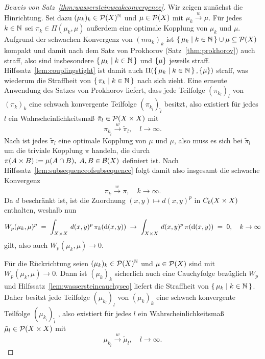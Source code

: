 \documentclass[../main/main.tex]{subfiles}
\begin{document}
	\begin{proof}[Beweis von Satz~\ref{thm:wassersteinweakconvergence}]
		Wir zeigen zunächst die Hinrichtung. Sei dazu $(\mu_k)_k \in \mathcal{P}(X)^{\mathbb{N}}$ und $\mu \in \mathcal{P}(X)$ mit $\mu_k \xrightarrow{w} \mu$. Für jedes $k \in \mathbb{N}$ sei $\pi_k \in \Pi(\mu_k, \mu)$ außerdem
		eine optimale Kopplung von $\mu_k$ und $\mu$. Aufgrund der schwachen Konvergenz von $(mu_k)_k$ ist $\left\{\, \mu_k \; \middle| \; k \in \mathbb{N} \,\right\} \cup {\mu} \subseteq \mathcal{P}(X)$ kompakt und damit nach dem 
		Satz von Prokhorov (Satz~\ref{thm:prokhorov}) auch straff, also sind insbesondere $\left\{\, \mu_k \; \middle| \; k \in \mathbb{N} \,\right\}$ und $\left\{\mu\right\}$ jeweils straff. 
		Hilfssatz~\ref{lem:couplingstight} ist damit auch $\Pi(\left\{\, \mu_k \; \middle| \; k \in \mathbb{N} \,\right\}, \left\{\mu\right\})$ straff, was wiederum die Straffheit von $\left\{\, \pi_k \; \middle| \; k \in \mathbb{N} \,\right\}$ nach sich zieht. Eine erneute Anwendung des
		Satzes von Prokhorov liefert, dass jede Teilfolge $(\pi_{k_l})_l$ von $(\pi_k)_k$ eine schwach konvergente Teilfolge $(\pi_{k_{\tilde{l}}})_{\tilde{l}}$ besitzt, also existiert für jedes $l$ ein Wahrscheinlichkeitsmaß $\tilde{\pi}_l \in \mathcal{P}(X \times X)$ mit
		\[ \pi_{k_{\tilde{l}}} \xrightarrow{w} \tilde{\pi}_l, \quad l \to \infty \text{.} \]
		Nach  ist jedes $\tilde{\pi}_l$ eine optimale Kopplung von $\mu$ und $\mu$, also muss es sich bei $\tilde{\pi}_l$ um die triviale Kopplung $\pi$ handeln, die durch
		$\pi(A \times B) \vcentcolon = \mu(A \cap B), \; A, B \in \mathcal{B}(X)$
		definiert ist.
		Nach Hilfssatz~\ref{lem:subsequenceofsubsequence} folgt damit also insgesamt die schwache Konvergenz
		\[ \pi_k \xrightarrow{w} \pi, \quad k \to \infty \text{.} \]
		Da $d$ beschränkt ist, ist die Zuordnung $(x, y) \mapsto d(x, y)^p$ in $C_b(X \times X)$ enthalten, weshalb nun
		\[ W_p(\mu_k, \mu)^p \; = \; \int_{X \times X} \, d(x, y)^p \, \pi_k(\mathrm{d}(x, y)) \; \to \; \int_{X \times X} \, d(x, y)^p \, \pi(\mathrm{d}(x, y)) \; = \; 0, \quad k \to \infty \]
		gilt, also auch $W_p(\mu_k, \mu) \to 0$.
		
		Für die Rückrichtung seien $(\mu_k)_k \in \mathcal{P}(X)^{\mathbb{N}}$ und $\mu \in \mathcal{P}(X)$ sind mit $W_p(\mu_k, \mu) \to 0$. Dann ist $(\mu_k)_k$ sicherlich auch eine Cauchyfolge bezüglich $W_p$ 
		und Hilfssatz~\ref{lem:wassersteincauchyseq} liefert die Straffheit von $\left\{\, \mu_k \; \middle| \; k \in \mathbb{N} \,\right\}$. Daher besitzt jede Teilfolge $(\mu_{k_l})_l$ von $(\mu_k)_k$ eine schwach konvergente Teilfolge $(\mu_{k_{\tilde{l}}})_{\tilde{l}}$ , also existiert für jedes $l$ ein Wahrscheinlichkeitsmaß $\tilde{\mu}_l \in \mathcal{P}(X \times X)$ mit
		\[ \mu_{k_{\tilde{l}}} \xrightarrow{w} \tilde{\mu}_l, \quad l \to \infty \text{.} \]
	\end{proof}
	
\end{document}
